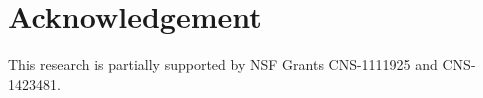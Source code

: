 \section*{Acknowledgement}
This research is partially supported by NSF Grants CNS-1111925 and
CNS-1423481.